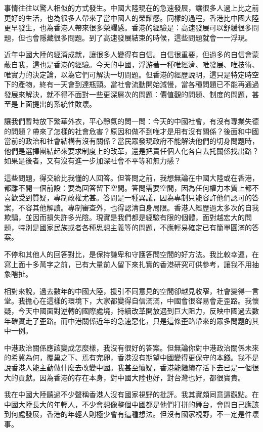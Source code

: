 事情往往以驚人相似的方式發生。中國大陸現在的急速發展，讓很多人過上比之前更好的生活，也為很多人帶來了當中國人的榮耀感。同樣的過程，香港比中國大陸更早發生，也為香港人帶來很多榮耀感。香港的經驗是：高速發展可以舒緩很多問題，但也會隱藏很多問題。到了高速發展結束的時候，這些問題就會一一浮現。

近年中國大陸的經濟成就，讓很多人變得有自信。自信很重要，但過多的自信會蒙蔽自我，這也是香港的經驗。今天的中國，浮游著一種唯經濟、唯發展、唯技術、唯實力的決定論，以為它們可解決一切問題。但香港的經歷說明，這只是特定時空下的產物，終有一天會到達瓶頸。當社會流動開始減慢，當各種問題已不能再通過發展來解決，就不得不面對一些更深層次的問題：價值觀的問題、制度的問題，甚至是上面提出的系統性敗壞。

讓我們暫時放下繁華外衣，平心靜氣的問一問：今天的中國社會，有沒有專業失德的問題？帶來了怎樣的社會危害？原因和做不到唯才是用有沒有關係？後面和中國當前的政治和社會結構有沒有關係？當民眾發現政府不能解決他們的切身問題時，他們是選擇團結起來要求制度上的改革，還是把責任個人化各自去托關係找出路？如果是後者，又有沒有進一步加深社會不平等和無力感？

這些問題，得交給比我懂的人回答。但答問之前，我想無論在中國大陸或在香港，都離不開一個前設：要為回答留下空間。答問需要空間，因為任何權力本質上都不喜歡受到質疑，專制政權尤甚。答問是一種異議，因為專制只能容許他們認可的答案，不容其他解讀。專制審查外，也得認清自身局限。香港人經歷過太多次的自我欺騙，並因而損失許多光陰。現實是我們都是經驗有限的個體，面對越宏大的問題，特別是國家民族或者各種思想主義等的問題，不應輕易確定已有簡單圓滿的答案。

不停和其他人的回答對比，是保持謙卑和守護答問空間的好方法。我比較幸運，在寫上面十多萬字之前，已有大量前人留下來扎實的香港研究可供參考，讓我不用抽象瞎扯。

相對來說，過去數年的中國大陸，援引不同意見的空間卻越見收窄，社會變得一言堂。我擔心在這樣的環境下，大家都變得自信滿滿，中國會很容易會走歪路。我懷疑，今天中國面對逆轉的國際處境，持續改革開放遇到巨大阻力，反映中國過去數年確實走了歪路。而中港關係近年的急速惡化，只是這條歪路帶來的眾多問題的其中一例。

中港政治關係應該變成怎麼樣，我沒有很好的答案。但無論你對中港政治關係未來的希冀為何，覆巢之下、焉有完卵，香港沒有期望中國變得更保守的本錢。我不是說香港人能主動做什麼去改變中國。我甚至懷疑，香港能繼續存活下去已是一個很大的貢獻。因為香港的存在本身，對中國大陸也好，對台灣也好，都很寶貴。

我在中國大陸聽過不少聲稱香港人沒有國家視野的批評。我其實頗同意這觀點。在中國大陸長大的年輕人，不少會想像整個中國都是他們打拼的舞台，會問自己應該到何處發展，香港的年輕人則極少會有這種想法。但沒有國家視野，不一定是件壞事。

